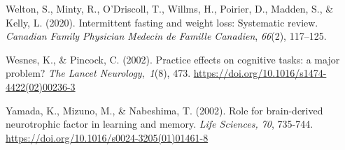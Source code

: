 \documentclass[authordate, empirical,issue]{jote-new-article}
\begin{document}
Welton, S., Minty, R., O'Driscoll, T., Willms, H., Poirier, D., Madden, S., \& Kelly, L. (2020). Intermittent fasting and weight loss: Systematic review. \emph{Canadian Family Physician Medecin de Famille Canadien}, \emph{66}(2), 117--125.






Wesnes, K., \& Pincock, C. (2002). Practice effects on cognitive tasks: a major problem? \emph{The Lancet Neurology}, \emph{1}(8), 473. \url{https://doi.org/10.1016/s1474-4422(02)00236-3}



Yamada, K., Mizuno, M., \& Nabeshima, T. (2002). Role for brain-derived neurotrophic factor in learning and memory. \emph{Life Sciences, 70}, 735-744. \url{https://doi.org/10.1016/s0024-3205(01)01461-8}









\end{document}
